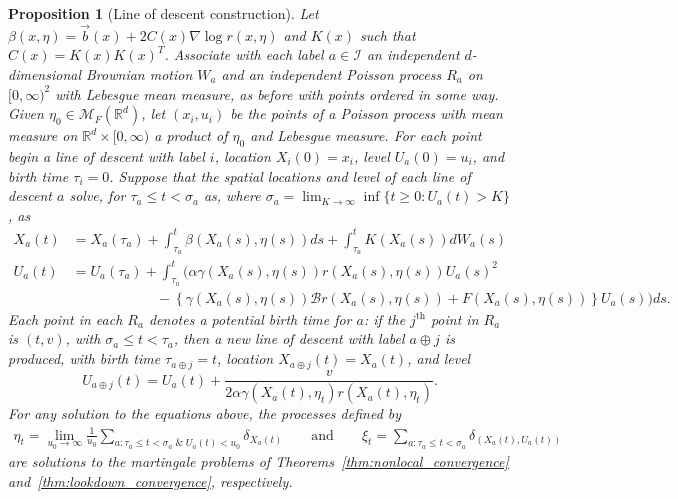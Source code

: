 \documentclass[12pt]{article}
\newtheorem{proposition}[theorem]{Proposition}
\newcommand{\IR}{\mathbb R}
\newcommand{\grad}{\nabla}
\newcommand{\DG}{\mathcal{B}}  %
\newcommand{\meanq}{\vec b}    %
\newcommand{\covq}{C}     %
\newcommand{\lp}{\xi}              %
\newcommand{\labelspace}{\mathcal{I}} %
\newcommand{\concat}{\oplus}   %
\newcommand{\measures}{\mathcal{M}_F(\IR^d)} %
\begin{document}
\begin{proposition}[Line of descent construction]
    \label{prop:limiting_construction}
Let $\beta(x, \eta) = \meanq(x) + 2 \covq(x) \grad \log r(x, \eta)$
and $K(x)$ such that $\covq(x) = K(x) K(x)^T$.
Associate with each label $a \in \labelspace$
an independent $d$-dimensional Brownian motion $W_a$
and an independent Poisson process $R_a$ on $[0, \infty)^2$
with Lebesgue mean measure,
as before with points ordered in some way.
Given $\eta_0 \in \measures$,
let $(x_i, u_i)$ be the points of a Poisson process
with mean measure on $\IR^d \times [0, \infty)$ a product of $\eta_0$ and Lebesgue measure.
For each point begin a line of descent
with label $i$, location $X_i(0) = x_i$, level $U_a(0) = u_i$, and birth time $\tau_i = 0$.
Suppose that the spatial locations and level of each line of descent $a$
solve, for $\tau_a \le t < \sigma_a$ as,
where $\sigma_a = \lim_{K \to \infty} \inf\{t \ge 0: U_a(t) > K\}$,
as
\begin{align*}
X_a(t)
    &=
    X_a(\tau_a)
    + \int_{\tau_a}^{t}
        \beta(X_a(s), \eta(s)) ds
    + \int_{\tau_a}^{t}
        K(X_a(s)) dW_a(s)
    \\
U_a(t)
    &=
    U_a(\tau_a)
    + \int_{\tau_a}^{t}
    \bigg(
        \alpha \gamma(X_a(s),\eta(s))
        r(X_a(s), \eta(s)) U_a(s)^2
\\ &\qquad \qquad \qquad {}   
        -
        \left\{
            \gamma(X_a(s),\eta(s)) \DG r(X_a(s),\eta(s))
            + F(X_a(s), \eta(s))
        \right\}
        U_a(s)
    \bigg)
    ds .
\end{align*}
Each point in each $R_a$ denotes a potential birth time for $a$:
if the $j^\text{th}$ point in $R_a$ is $(t, v)$, with $\sigma_a \le t < \tau_a$,
then a new line of descent with label $a \concat j$ is produced,
with birth time $\tau_{a \concat j} = t$,
    location $X_{a \concat j}(t) = X_a(t)$, and level
$$
    U_{a \concat j}(t) = U_a(t)
    + \frac{v}{ 2 \alpha \gamma(X_a(t), \eta_t) r(X_a(t), \eta_t) } .
$$
For any solution to the equations above, the processes defined by
\begin{align*}
    \eta_t
    =
    \lim_{u_0 \to \infty} \frac{1}{u_0}
        \sum_{a : \tau_a \le t < \sigma_a \;\&\; U_a(t) < u_0} \delta_{X_a(t)}
    \qquad \text{and} \qquad
    \lp_t = \sum_{a : \tau_a \le t < \sigma_a} \delta_{(X_a(t), U_a(t))} 
\end{align*}
are solutions to the martingale problems of
Theorems~\ref{thm:nonlocal_convergence} and~\ref{thm:lookdown_convergence},
respectively.
\end{proposition}
\end{document}
